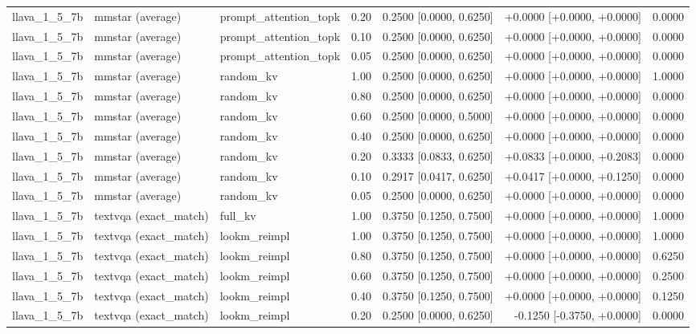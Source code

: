 \begin{longtable}{lllrrrr}
llava\_1\_5\_7b & mmstar (average) & prompt\_attention\_topk & 0.20 & 0.2500 [0.0000, 0.6250] & +0.0000 [+0.0000, +0.0000] & 0.0000 \\
llava\_1\_5\_7b & mmstar (average) & prompt\_attention\_topk & 0.10 & 0.2500 [0.0000, 0.6250] & +0.0000 [+0.0000, +0.0000] & 0.0000 \\
llava\_1\_5\_7b & mmstar (average) & prompt\_attention\_topk & 0.05 & 0.2500 [0.0000, 0.6250] & +0.0000 [+0.0000, +0.0000] & 0.0000 \\
llava\_1\_5\_7b & mmstar (average) & random\_kv & 1.00 & 0.2500 [0.0000, 0.6250] & +0.0000 [+0.0000, +0.0000] & 1.0000 \\
llava\_1\_5\_7b & mmstar (average) & random\_kv & 0.80 & 0.2500 [0.0000, 0.6250] & +0.0000 [+0.0000, +0.0000] & 0.0000 \\
llava\_1\_5\_7b & mmstar (average) & random\_kv & 0.60 & 0.2500 [0.0000, 0.5000] & +0.0000 [+0.0000, +0.0000] & 0.0000 \\
llava\_1\_5\_7b & mmstar (average) & random\_kv & 0.40 & 0.2500 [0.0000, 0.6250] & +0.0000 [+0.0000, +0.0000] & 0.0000 \\
llava\_1\_5\_7b & mmstar (average) & random\_kv & 0.20 & 0.3333 [0.0833, 0.6250] & +0.0833 [+0.0000, +0.2083] & 0.0000 \\
llava\_1\_5\_7b & mmstar (average) & random\_kv & 0.10 & 0.2917 [0.0417, 0.6250] & +0.0417 [+0.0000, +0.1250] & 0.0000 \\
llava\_1\_5\_7b & mmstar (average) & random\_kv & 0.05 & 0.2500 [0.0000, 0.6250] & +0.0000 [+0.0000, +0.0000] & 0.0000 \\
llava\_1\_5\_7b & textvqa (exact\_match) & full\_kv & 1.00 & 0.3750 [0.1250, 0.7500] & +0.0000 [+0.0000, +0.0000] & 1.0000 \\
llava\_1\_5\_7b & textvqa (exact\_match) & lookm\_reimpl & 1.00 & 0.3750 [0.1250, 0.7500] & +0.0000 [+0.0000, +0.0000] & 1.0000 \\
llava\_1\_5\_7b & textvqa (exact\_match) & lookm\_reimpl & 0.80 & 0.3750 [0.1250, 0.7500] & +0.0000 [+0.0000, +0.0000] & 0.6250 \\
llava\_1\_5\_7b & textvqa (exact\_match) & lookm\_reimpl & 0.60 & 0.3750 [0.1250, 0.7500] & +0.0000 [+0.0000, +0.0000] & 0.2500 \\
llava\_1\_5\_7b & textvqa (exact\_match) & lookm\_reimpl & 0.40 & 0.3750 [0.1250, 0.7500] & +0.0000 [+0.0000, +0.0000] & 0.1250 \\
llava\_1\_5\_7b & textvqa (exact\_match) & lookm\_reimpl & 0.20 & 0.2500 [0.0000, 0.6250] & -0.1250 [-0.3750, +0.0000] & 0.0000 \\

\end{longtable}
